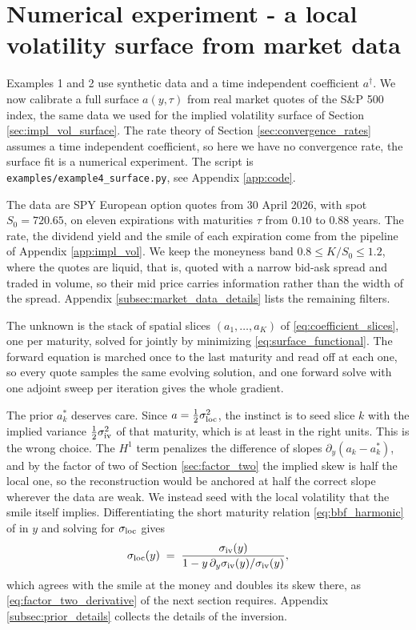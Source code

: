 \section{Numerical experiment - a local volatility surface from market data}\label{sec:market_surface}

Examples 1 and 2 use synthetic data and a time independent coefficient $a^\dagger$.
We now calibrate a full surface $a(y,\tau)$ from real market quotes of the S\&P 500 index,
the same data we used for the implied volatility surface of Section \ref{sec:impl_vol_surface}.
The rate theory of Section \ref{sec:convergence_rates} assumes a time independent coefficient,
so here we have no convergence rate,
the surface fit is a numerical experiment.
The script is \texttt{examples/example4\_surface.py}, see Appendix \ref{app:code}.

The data are SPY European option quotes from 30 April 2026, with spot $S_0 = 720.65$,
on eleven expirations with maturities $\tau$ from $0.10$ to $0.88$ years.
The rate, the dividend yield and the smile of each expiration come from the pipeline of
Appendix \ref{app:impl_vol}.
We keep the moneyness band $0.8 \le K/S_0 \le 1.2$, where the quotes are liquid,
that is, quoted with a narrow bid-ask spread and traded in volume,
so their mid price carries information rather than the width of the spread.
Appendix \ref{subsec:market_data_details} lists the remaining filters.

The unknown is the stack of spatial slices $(a_1,\dots,a_K)$ of \eqref{eq:coefficient_slices},
one per maturity, solved for jointly by minimizing \eqref{eq:surface_functional}.
The forward equation is marched once to the last maturity and read off at each one,
so every quote samples the same evolving solution,
and one forward solve with one adjoint sweep per iteration gives the whole gradient.

The prior $a^*_k$ deserves care.
Since $a = \tfrac12\sigma_{\mathrm{loc}}^2$, the instinct is to seed slice $k$ with the implied variance
$\tfrac12\sigma_{\mathrm{iv}}^2$ of that maturity, which is at least in the right units.
This is the wrong choice.
The $H^1$ term penalizes the difference of slopes $\partial_y(a_k - a^*_k)$,
and by the factor of two of Section \ref{sec:factor_two} the implied skew is half the local one,
so the reconstruction would be anchored at half the correct slope wherever the data are weak.
We instead seed with the local volatility that the smile itself implies.
Differentiating the short maturity relation \eqref{eq:bbf_harmonic} of
\cite{berestycki_busca_florent} in $y$ and solving for $\sigma_{\mathrm{loc}}$ gives
\begin{equation}\label{eq:bbf_inversion}
    \sigma_{\mathrm{loc}}(y) \;=\; \frac{\sigma_{\mathrm{iv}}(y)}
        {1 - y\,\partial_y\sigma_{\mathrm{iv}}(y)/\sigma_{\mathrm{iv}}(y)},
\end{equation}
which agrees with the smile at the money and doubles its skew there,
as \eqref{eq:factor_two_derivative} of the next section requires.
Appendix \ref{subsec:prior_details} collects the details of the inversion.


